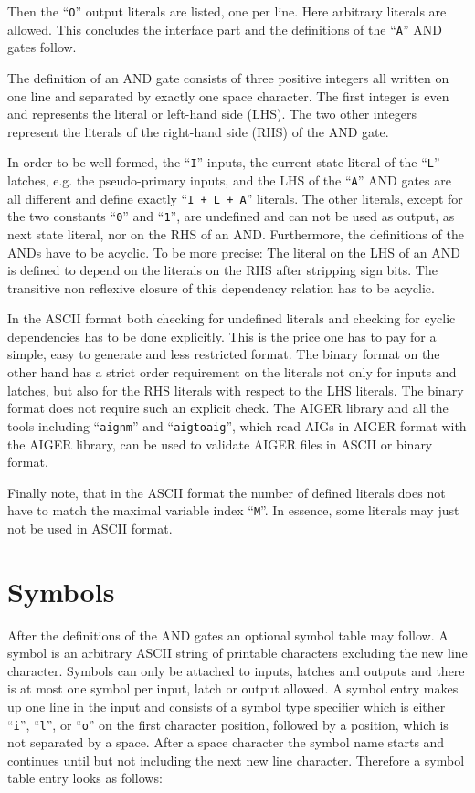 \documentclass{llncs}
\begin{document}
  Then the ``\texttt{O}'' output literals are listed, one per line.  Here arbitrary
  literals are allowed.  This concludes the interface part and the
  definitions of the ``\texttt{A}'' AND gates follow.

  The definition of an AND gate consists of three positive integers all
  written on one line and separated by exactly one space character.  The
  first integer is even and represents the literal or left-hand side (LHS).
  The two other integers represent the literals of the right-hand side
  (RHS) of the AND gate.

  In order to be well formed, the ``\texttt{I}'' inputs, the current state literal of
  the ``\texttt{L}'' latches, e.g. the pseudo-primary inputs, and the LHS of the
  ``\texttt{A}''
  AND gates are all different and define exactly ``\texttt{I + L + A}'' literals.  The
  other literals, except for the two constants ``\texttt{0}'' and ``\texttt{1}'', are undefined
  and can not be used as output, as next state literal, nor on the RHS of an
  AND.  Furthermore, the definitions of the ANDs have to be acyclic.  To be
  more precise: The literal on the LHS of an AND is defined to depend on the
  literals on the RHS after stripping sign bits.  The transitive non
  reflexive closure of this dependency relation has to be acyclic.

  In the ASCII format both checking for undefined literals and checking for
  cyclic dependencies has to be done explicitly.  This is the price one has
  to pay for a simple, easy to generate and less restricted format.  The
  binary format on the other hand has a strict order requirement on the
  literals not only for inputs and latches, but also for the RHS literals
  with respect to the LHS literals.  The binary format does not require such
  an explicit check. The AIGER library and all the tools including
  ``\texttt{aignm}''
  and ``\texttt{aigtoaig}'', which read AIGs in AIGER format with the AIGER library,
  can be used to validate AIGER files in ASCII or binary format.

  Finally note, that in the ASCII format the number of defined literals does
  not have to match the maximal variable index ``\texttt{M}''.  In essence, some
  literals may just not be used in ASCII format.

\section{Symbols}
  
  After the definitions of the AND gates an optional symbol table may
  follow.  A symbol is an arbitrary ASCII string of printable characters
  excluding the new line character.  Symbols can only be attached to inputs,
  latches and outputs and there is at most one symbol per input, latch or
  output allowed.  A symbol entry makes up one line in the input and
  consists of a symbol type specifier which is either ``\texttt{i}'',
  ``\texttt{l}'', or ``\texttt{o}'' on
  the first character position, followed by a position, which is not
  separated by a space.  After a space character the symbol name starts and
  continues until but not including the next new line character.  Therefore
  a symbol table entry looks as follows:
    
\end{document}
